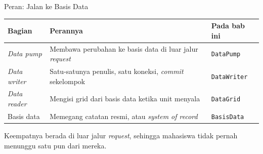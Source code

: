 \documentclass[aspectratio=169, table, 12pt]{beamer}
\begin{document}
\begin{frame}{{\Large Peran: Jalan ke Basis Data}}
  \vspace{8pt}
  \centering
  \small
  \begin{tabularx}{0.96\textwidth}{|l|X|l|}
    \hline
    \textbf{Bagian} & \textbf{Perannya} & \textbf{Pada bab ini} \\
    \hline
    \textit{Data pump} & Membawa perubahan ke basis data di luar jalur \textit{request} & \texttt{DataPump} \\
    \hline
    \textit{Data writer} & Satu-satunya penulis, satu koneksi, \textit{commit} sekelompok & \texttt{DataWriter} \\
    \hline
    \textit{Data reader} & Mengisi grid dari basis data ketika unit menyala & \texttt{DataGrid} \\
    \hline
    Basis data & Memegang catatan resmi, atau \textit{system of record} & \texttt{BasisData} \\
    \hline
  \end{tabularx}

  \vspace{6pt}
  \raggedright
  {\small Keempatnya berada di luar jalur \textit{request}, sehingga mahasiswa
  tidak pernah menunggu satu pun dari mereka.}
\end{frame}
\end{document}
